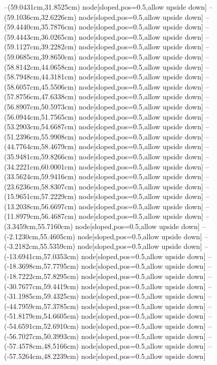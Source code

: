 --(59.0431cm,31.8525cm) node[sloped,pos=0.5,allow upside down]{\ArrowIn}
--(59.1036cm,32.6226cm) node[sloped,pos=0.5,allow upside down]{\arrowIn}
--(59.4440cm,35.7876cm) node[sloped,pos=0.5,allow upside down]{\ArrowIn}
--(59.4443cm,36.0265cm) node[sloped,pos=0.5,allow upside down]{\arrowIn}
--(59.1127cm,39.2282cm) node[sloped,pos=0.5,allow upside down]{\ArrowIn}
--(59.0685cm,39.8650cm) node[sloped,pos=0.5,allow upside down]{\arrowIn}
--(58.8142cm,44.0658cm) node[sloped,pos=0.5,allow upside down]{\ArrowIn}
--(58.7948cm,44.3181cm) node[sloped,pos=0.5,allow upside down]{\arrowIn}
--(58.6057cm,45.5506cm) node[sloped,pos=0.5,allow upside down]{\ArrowIn}
--(57.8756cm,47.6338cm) node[sloped,pos=0.5,allow upside down]{\ArrowIn}
--(56.8907cm,50.5973cm) node[sloped,pos=0.5,allow upside down]{\ArrowIn}
--(56.0944cm,51.7565cm) node[sloped,pos=0.5,allow upside down]{\ArrowIn}
--(53.2903cm,54.6687cm) node[sloped,pos=0.5,allow upside down]{\ArrowIn}
--(51.2396cm,55.9908cm) node[sloped,pos=0.5,allow upside down]{\ArrowIn}
--(44.7764cm,58.4679cm) node[sloped,pos=0.5,allow upside down]{\ArrowIn}
--(35.9481cm,59.8266cm) node[sloped,pos=0.5,allow upside down]{\ArrowIn}
--(34.2221cm,60.0001cm) node[sloped,pos=0.5,allow upside down]{\ArrowIn}
--(33.5624cm,59.9416cm) node[sloped,pos=0.5,allow upside down]{\arrowIn}
--(23.6236cm,58.8307cm) node[sloped,pos=0.5,allow upside down]{\ArrowIn}
--(15.9651cm,57.2229cm) node[sloped,pos=0.5,allow upside down]{\ArrowIn}
--(13.2038cm,56.6697cm) node[sloped,pos=0.5,allow upside down]{\ArrowIn}
--(11.8979cm,56.4687cm) node[sloped,pos=0.5,allow upside down]{\ArrowIn}
--(3.3459cm,55.7160cm) node[sloped,pos=0.5,allow upside down]{\ArrowIn}
--(-2.1230cm,55.4605cm) node[sloped,pos=0.5,allow upside down]{\ArrowIn}
--(-3.2182cm,55.5359cm) node[sloped,pos=0.5,allow upside down]{\ArrowIn}
--(-13.6941cm,57.0353cm) node[sloped,pos=0.5,allow upside down]{\ArrowIn}
--(-18.3698cm,57.7795cm) node[sloped,pos=0.5,allow upside down]{\ArrowIn}
--(-18.7222cm,57.8295cm) node[sloped,pos=0.5,allow upside down]{\arrowIn}
--(-30.7677cm,59.4419cm) node[sloped,pos=0.5,allow upside down]{\ArrowIn}
--(-31.1985cm,59.4325cm) node[sloped,pos=0.5,allow upside down]{\arrowIn}
--(-44.7959cm,57.3785cm) node[sloped,pos=0.5,allow upside down]{\ArrowIn}
--(-51.8179cm,54.6605cm) node[sloped,pos=0.5,allow upside down]{\ArrowIn}
--(-54.6591cm,52.6910cm) node[sloped,pos=0.5,allow upside down]{\ArrowIn}
--(-56.7027cm,50.3993cm) node[sloped,pos=0.5,allow upside down]{\ArrowIn}
--(-57.4578cm,48.5166cm) node[sloped,pos=0.5,allow upside down]{\ArrowIn}
--(-57.5264cm,48.2239cm) node[sloped,pos=0.5,allow upside down]{\arrowIn}
